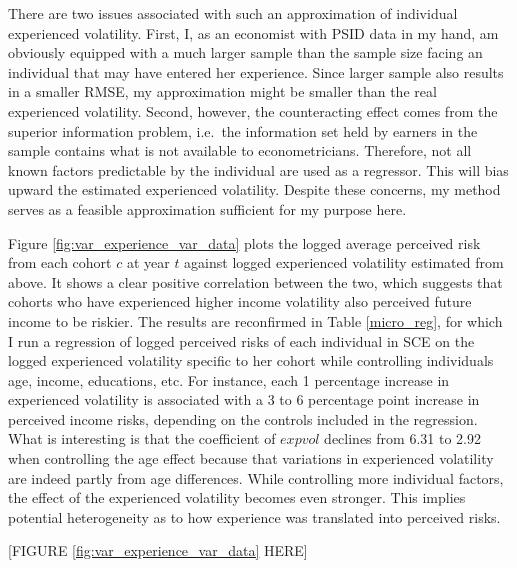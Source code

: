 \documentclass[12pt,notitlepage,onecolumn,aps,pra]{article}
\begin{document}
There are two issues associated with such an approximation of individual
experienced volatility. First, I, as an economist with PSID data in my
hand, am obviously equipped with a much larger sample than the sample
size facing an individual that may have entered her experience. Since
larger sample also results in a smaller RMSE, my approximation might be
smaller than the real experienced volatility. Second, however, the
counteracting effect comes from the superior information problem,
i.e.~the information set held by earners in the sample contains what is
not available to econometricians. Therefore, not all known factors
predictable by the individual are used as a regressor. This will bias
upward the estimated experienced volatility. Despite these concerns, my
method serves as a feasible approximation sufficient for my purpose
here.

Figure \ref{fig:var_experience_var_data} plots the logged average
perceived risk from each cohort \(c\) at year \(t\) against logged
experienced volatility estimated from above. It shows a clear positive
correlation between the two, which suggests that cohorts who have
experienced higher income volatility also perceived future income to be
riskier. The results are reconfirmed in Table \ref{micro_reg}, for which
I run a regression of logged perceived risks of each individual in SCE
on the logged experienced volatility specific to her cohort while
controlling individuals age, income, educations, etc. For instance, each
1 percentage increase in experienced volatility is associated with a 3
to 6 percentage point increase in perceived income risks, depending on
the controls included in the regression. What is interesting is that the
coefficient of \(expvol\) declines from 6.31 to 2.92 when controlling
the age effect because that variations in experienced volatility are
indeed partly from age differences. While controlling more individual
factors, the effect of the experienced volatility becomes even stronger.
This implies potential heterogeneity as to how experience was translated
into perceived risks.

{[}FIGURE \ref{fig:var_experience_var_data} HERE{]}
\end{document}
